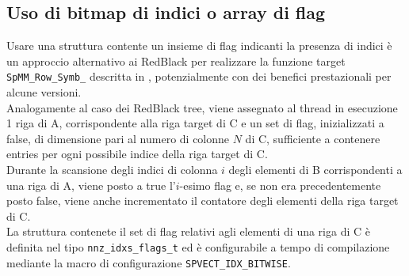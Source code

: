 \subsection{Uso di bitmap di indici o array di flag} \label{chSpMMSymb:structFlagSet}
Usare una struttura contente un insieme di flag indicanti
la presenza di indici è un approccio alternativo ai RedBlack
per realizzare la funzione target \verb|SpMM_Row_Symb_| descritta in , 
potenzialmente con dei benefici prestazionali per alcune versioni.\\
Analogamente al caso dei RedBlack tree, viene assegnato al thread in esecuzione 
1 riga di A, corrispondente alla riga target di C e 
un set di flag, inizializzati a false, di dimensione pari al numero di colonne $N$ di C,
sufficiente a contenere entries per ogni possibile indice della riga target di C.\\
Durante la scansione degli indici di colonna $i$ degli elementi \nnz di B corrispondenti a una riga di A, 
viene posto a true l'$i$-esimo flag e, se non era precedentemente posto false, viene anche incrementato il 
contatore degli elementi \nnz della riga target di C.\\
La struttura contenete il set di flag relativi agli elementi \nnz di una riga di C 
è definita nel tipo \verb|nnz_idxs_flags_t| ed è 
configurabile a tempo di compilazione mediante la macro di configurazione \verb|SPVECT_IDX_BITWISE|.
